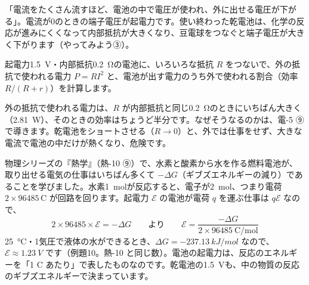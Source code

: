 \begin{phyomi}[$V=\mathcal E-rI$]
「電流をたくさん流すほど、電池の中で電圧が使われ、外に出せる電圧が下がる」。電流が0のときの端子電圧が起電力です。使い終わった乾電池は、化学の反応が進みにくくなって内部抵抗が大きくなり、豆電球をつなぐと端子電圧が大きく下がります（やってみよう③）。
\end{phyomi}

起電力\qty{1.5}{V}・内部抵抗\qty{0.2}{\ohm}の電池に、いろいろな抵抗 $R$ をつないで、外の抵抗で使われる電力 $P=RI^2$ と、電池が出す電力のうち外で使われる割合（効率 $R/(R+r)$）を計算します。
\begin{bkcenter}
\label{ph:電-4:tab-sheet}
\end{bkcenter}
外の抵抗で使われる電力は、$R$ が内部抵抗と同じ\qty{0.2}{\ohm}のときにいちばん大きく（\qty{2.81}{W}）、そのときの効率はちょうど半分です。なぜそうなるのかは、電-5 ⑨で導きます。乾電池をショートさせる（$R\to0$）と、外では仕事をせず、大きな電流で電池の中だけが熱くなり、危険です。

物理シリーズの『熱学』（熱-10 ⑨）で、水素と酸素から水を作る燃料電池が、取り出せる電気の仕事はいちばん多くて $-\Delta G$（ギブズエネルギーの減り）であることを学びました。水素\qty{1}{mol}が反応すると、電子が\qty{2}{mol}、つまり電荷 $2\times\num{96485}$\,C が回路を回ります。起電力 $\mathcal E$ の電池が電荷 $q$ を運ぶ仕事は $q\mathcal E$ なので、
\[2\times\num{96485}\times\mathcal E=-\Delta G\qquad\text{より}\qquad\mathcal E=\frac{-\Delta G}{2\times\num{96485}\ \text{C/mol}}\]
\qty{25}{\celsius}・1気圧で液体の水ができるとき、$\Delta G=\qty{-237.13}{kJ/mol}$ なので、$\mathcal E\approx\qty{1.23}{V}$ です（例題10。熱-10 と同じ数）。電池の起電力は、反応のエネルギーを「1 C あたり」で表したものなのです。乾電池の\qty{1.5}{V}も、中の物質の反応のギブズエネルギーで決まっています。

